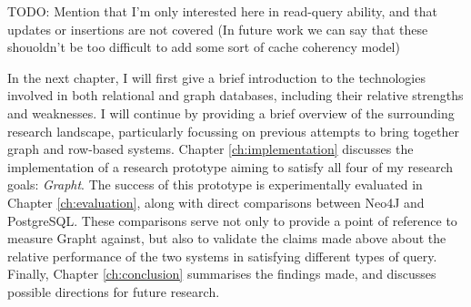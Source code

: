 TODO: Mention that I'm only interested here in read-query ability, and that updates or insertions are not covered
 (In future work we can say that these shouoldn't be too difficult to add some sort of cache coherency model)



In the next chapter, I will first give a brief introduction to the
technologies involved in both relational and graph databases, including their
relative strengths and weaknesses. I will continue by providing a brief
overview of the surrounding research landscape, particularly  focussing on
previous attempts to bring together graph and row-based systems. Chapter
\ref{ch:implementation} discusses the implementation of a research prototype
aiming to satisfy all four of my research goals: \textit{Grapht}. The success of
this prototype is experimentally evaluated in Chapter \ref{ch:evaluation},
along with direct comparisons between Neo4J and PostgreSQL. These comparisons
serve not only to provide a point of reference to measure Grapht against, but
also to validate the claims made above about the relative performance of the
two systems in satisfying different types of query. Finally, Chapter
\ref{ch:conclusion} summarises the findings made, and discusses possible
directions for future research.
